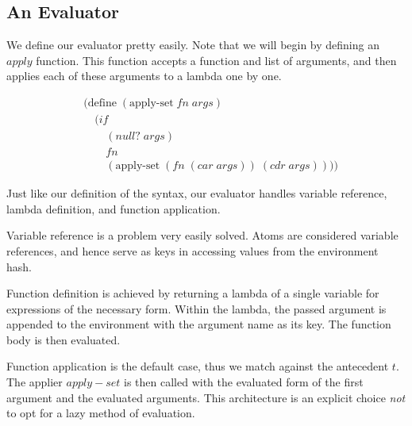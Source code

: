 \subsection{An Evaluator}
We define our evaluator pretty easily. Note that we will begin by defining an 
$apply$ function. This function accepts a function and list of arguments, and 
then applies each of these arguments to a lambda one by one.

\begin{figure}[ht]
\caption{}\label{scheme}
\begin{align*}
& (\text{define} \; (\text{apply-set} \; fn \; args)
\\& \quad (if
\\& \qquad (null? \; args)
\\& \qquad fn
\\& \qquad (\text{apply-set} \; (fn \; (car \; args)) \; (cdr \; args))))
\end{align*}
\end{figure}

Just like our definition of the syntax, our evaluator handles variable reference, 
lambda definition, and function application. 

Variable reference is a problem very easily solved. Atoms are considered 
variable references, and hence serve as keys in accessing values from the 
environment hash.

Function definition is achieved by returning a lambda of a single variable for 
expressions of the necessary form. Within the lambda, the passed argument is 
appended to the environment with the argument name as its key. The function body 
is then evaluated.

Function application is the default case, thus we match against the antecedent 
$t$. The applier $apply-set$ is then called with the evaluated form of the first 
argument and the evaluated arguments. This architecture is an explicit choice 
\emph{not} to opt for a lazy method of evaluation.


